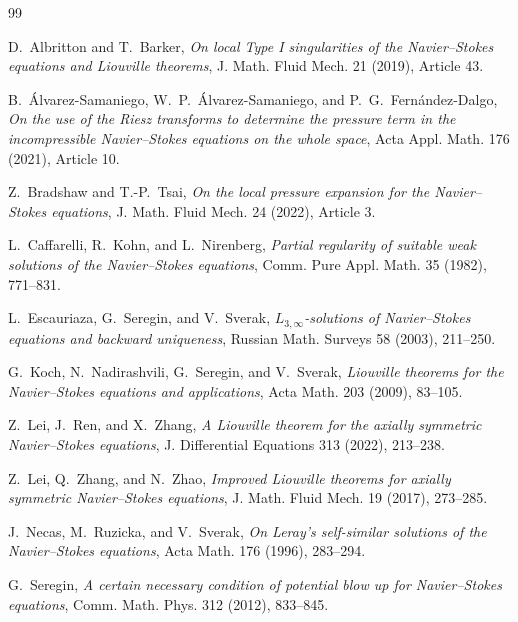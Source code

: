 \documentclass[11pt]{amsart}
\numberwithin{equation}{section}
\theoremstyle{plain}
\theoremstyle{definition}
\theoremstyle{remark}
\begin{document}
\begin{thebibliography}{99}

D.~Albritton and T.~Barker,
\emph{On local Type I singularities of the Navier--Stokes equations and
Liouville theorems},
J. Math. Fluid Mech. 21 (2019), Article 43.

B.~\'Alvarez-Samaniego, W.~P.~\'Alvarez-Samaniego, and
P.~G.~Fern\'andez-Dalgo,
\emph{On the use of the Riesz transforms to determine the pressure term in the
incompressible Navier--Stokes equations on the whole space},
Acta Appl. Math. 176 (2021), Article 10.

Z.~Bradshaw and T.-P.~Tsai,
\emph{On the local pressure expansion for the Navier--Stokes equations},
J. Math. Fluid Mech. 24 (2022), Article 3.

L.~Caffarelli, R.~Kohn, and L.~Nirenberg,
\emph{Partial regularity of suitable weak solutions of the Navier--Stokes
equations},
Comm. Pure Appl. Math. 35 (1982), 771--831.

L.~Escauriaza, G.~Seregin, and V.~Sverak,
\emph{\(L_{3,\infty}\)-solutions of Navier--Stokes equations and backward
uniqueness},
Russian Math. Surveys 58 (2003), 211--250.

G.~Koch, N.~Nadirashvili, G.~Seregin, and V.~Sverak,
\emph{Liouville theorems for the Navier--Stokes equations and applications},
Acta Math. 203 (2009), 83--105.

Z.~Lei, J.~Ren, and X.~Zhang,
\emph{A Liouville theorem for the axially symmetric Navier--Stokes equations},
J. Differential Equations 313 (2022), 213--238.

Z.~Lei, Q.~Zhang, and N.~Zhao,
\emph{Improved Liouville theorems for axially symmetric Navier--Stokes
equations},
J. Math. Fluid Mech. 19 (2017), 273--285.

J.~Necas, M.~Ruzicka, and V.~Sverak,
\emph{On Leray's self-similar solutions of the Navier--Stokes equations},
Acta Math. 176 (1996), 283--294.

G.~Seregin,
\emph{A certain necessary condition of potential blow up for Navier--Stokes
equations},
Comm. Math. Phys. 312 (2012), 833--845.

\end{thebibliography}
\end{document}
